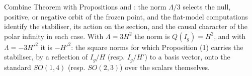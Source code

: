 Combine Theorem  with Propositions  and : the norm $\Lambda/3$ selects the null, positive, or negative orbit of the frozen point, and the flat-model computations identify the stabiliser, its action on the section, and the causal character of the polar infinity in each case. With $\Lambda = 3H^{2}$ the norm is $Q(I_g) = H^{2}$, and with $\Lambda = -3H'^{2}$ it is $-H'^{2}$: the square norms for which Proposition (1) carries the stabiliser, by a reflection of $I_g/H$ (resp. $I_g/H'$) to a basis vector, onto the standard $SO(1,4)$ (resp. $SO(2,3)$) over the scalars themselves.
